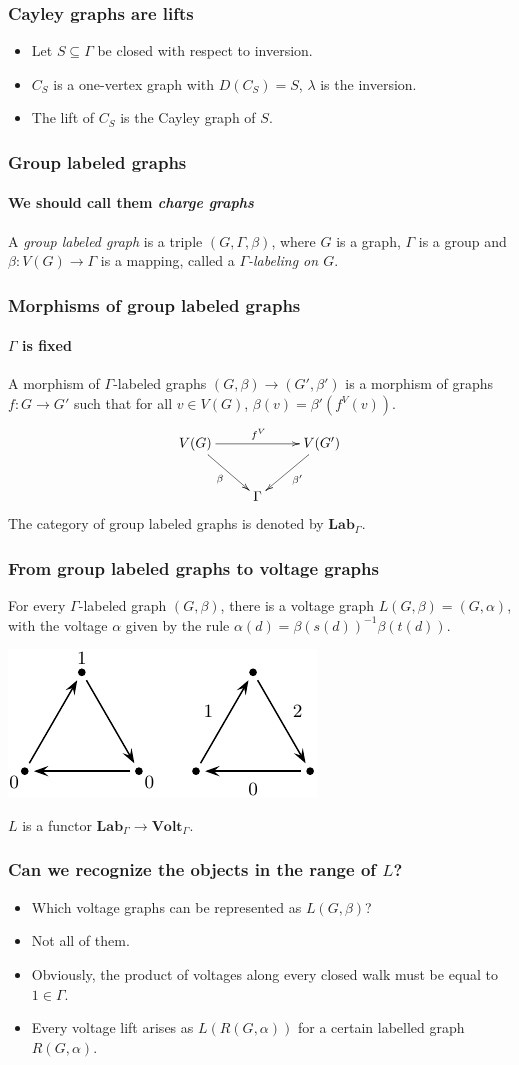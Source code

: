 \documentclass{beamer}
\newcommand{\Volt}{\mathbf{Volt}}
\newcommand{\Lab}{\mathbf{Lab}}
\begin{document}
\begin{frame}
\frametitle{Cayley graphs are lifts}
\begin{itemize}
\item Let $S\subseteq\Gamma$ be closed with respect to inversion.
\item $C_S$ is a one-vertex graph with $D(C_S)=S$, $\lambda$ is the inversion.
\item The lift of $C_S$ is the Cayley graph of $S$.
\end{itemize}
\end{frame}
\begin{frame}
\frametitle{Group labeled graphs}
\framesubtitle{We should call them \emph{charge graphs}}
A {\em group labeled graph} 
is a triple $(G,Γ,β)$,
where $G$ is a graph, $Γ$ is a group and $β\colon V(G)\to Γ$ is a mapping, called a {\em $Γ$-labeling on
$G$}.

\end{frame}
\begin{frame}
\frametitle{Morphisms of group labeled graphs}
\framesubtitle{$Γ$ is fixed}
A morphism of $\Gamma$-labeled graphs $(G,β)\to (G',β')$ is a
morphism of graphs $f\colon G\to G'$ such that
for all $v\in V(G)$, $β(v)=β'(f^V(v))$.
\[
\xymatrix{
V(G)
	\ar[rr]^{f^V}
	\ar[rd]_\beta
&
~
&
V(G')
	\ar[ld]^{\beta'}
\\
~
&
\Gamma
}
\]
The category of group labeled graphs is denoted by $\Lab_\Gamma$.
\end{frame}
\begin{frame}
\frametitle{From group labeled graphs to voltage graphs}

For every $\Gamma$-labeled graph $(G,β)$, there is a voltage graph
$L(G,β)=(G,α)$, with the voltage $α$ given by the rule
$α(d)=β(s(d))^{-1}β(t(d))$.
\begin{center}
\includegraphics{lleft}
\end{center}
$L$ is a functor $\Lab_\Gamma\to\Volt_\Gamma$.
\end{frame}
\begin{frame}
\frametitle{Can we recognize the objects in the range of $L$?}

\begin{itemize}
\item Which voltage graphs can be represented as $L(G,\beta)$?
\item Not all of them.
\item Obviously, the product of voltages along every closed walk must be 
equal to $1\in\Gamma$.
\item Every voltage lift arises as $L(R(G,\alpha))$ for a certain labelled
graph $R(G,\alpha)$.
\end{itemize}
\end{frame}
\end{document}

